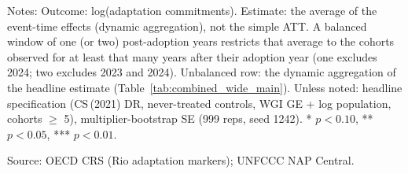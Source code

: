 \begin{table}[H]
\centering
\caption{Dynamic ATT over a balanced event window of one or two post-adoption years}
\label{tab:att_balance}
\begingroup\small
{}
\endgroup
\par\vspace{4pt}
\begin{minipage}{\linewidth}\footnotesize
Notes: Outcome: log(adaptation commitments). Estimate: the average of the event-time effects (dynamic aggregation), not the simple ATT. A balanced window of one (or two) post-adoption years restricts that average to the cohorts observed for at least that many years after their adoption year (one excludes 2024; two excludes 2023 and 2024). Unbalanced row: the dynamic aggregation of the headline estimate (Table~\ref{tab:combined_wide_main}). Unless noted: headline specification (CS\,(2021) DR, never-treated controls, WGI GE + log population, cohorts $\geq$ 5), multiplier-bootstrap SE (999 reps, seed 1242). * $p<0.10$, ** $p<0.05$, *** $p<0.01$.\par
Source: OECD CRS (Rio adaptation markers); UNFCCC NAP Central.
\end{minipage}
\end{table}
